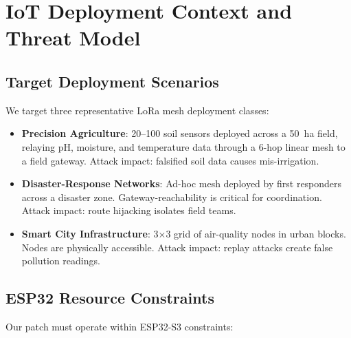 \documentclass[10pt,journal,compsoc]{IEEEtran}
\begin{document}
\section{IoT Deployment Context and Threat Model}
\label{sec:threat}

\subsection{Target Deployment Scenarios}

We target three representative LoRa mesh deployment classes:

\begin{itemize}
  \item \textbf{Precision Agriculture}: 20–100 soil sensors deployed
    across a 50~ha field, relaying pH, moisture, and temperature
    data through a 6-hop linear mesh to a field gateway.
    Attack impact: falsified soil data causes mis-irrigation.

  \item \textbf{Disaster-Response Networks}: Ad-hoc mesh deployed
    by first responders across a disaster zone. Gateway-reachability
    is critical for coordination. Attack impact: route hijacking
    isolates field teams.

  \item \textbf{Smart City Infrastructure}: 3×3 grid of air-quality
    nodes in urban blocks. Nodes are physically accessible.
    Attack impact: replay attacks create false pollution readings.
\end{itemize}

\subsection{ESP32 Resource Constraints}

Our patch must operate within ESP32-S3 constraints:
\end{document}
